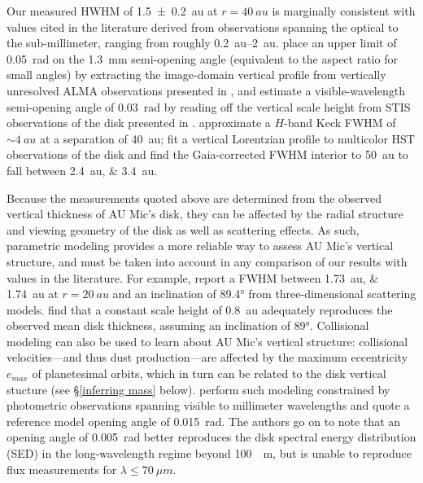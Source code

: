 \documentclass[modern]{aastex62}
\begin{document}
Our measured HWHM of \SI{1.5 \pm 0.2}{au} at $r=\SI{40}{au}$ is marginally consistent with values cited in the literature derived from observations spanning the optical to the sub-millimeter, ranging from roughly \SIrange{0.2}{2}{au}.
\citet{schuppler17} place an upper limit of \SI{0.05}{\radian} on the \SI{1.3}{mm} semi-opening angle (equivalent to the aspect ratio for small angles) by extracting the image-domain vertical profile from vertically unresolved ALMA observations presented in \citet{macgregor13}, and estimate a visible-wavelength semi-opening angle of \SI{0.03}{\radian} by reading off the vertical scale height from STIS observations of the disk presented in \citet{schneider14}.
\citet{metchev05} approximate a $H$-band Keck FWHM of $\sim \SI{4}{au}$ at a separation of \SI{40}{au};
\citet{krist05} fit a vertical Lorentzian profile to multicolor HST observations of the disk and find the Gaia-corrected FWHM interior to \SI{50}{au} to fall between \SIlist{2.4;3.4}{au}.

Because the measurements quoted above are determined from the observed vertical thickness of AU Mic's disk, they can be affected by the radial structure and viewing geometry of the disk as well as scattering effects. 
As such, parametric modeling provides a more reliable way to assess AU Mic's vertical structure, and must be taken into account in any comparison of our results with values in the literature.  
For example, \citet{krist05} report a FWHM between \SIlist{1.73;1.74}{au} at $r=\SI{20}{au}$ and an inclination of \ang[angle-symbol-over-decimal]{89.4} from three-dimensional scattering models.
\citet{metchev05} find that a constant scale height of \SI{0.8}{au} adequately reproduces the observed mean disk thickness, assuming an inclination of \ang[angle-symbol-over-decimal]{89}.
Collisional modeling can also be used to learn about AU Mic's vertical structure: collisional velocities---and thus dust production---are affected by the maximum eccentricity $e_{max}$ of planetesimal orbits, which in turn can be related to the disk vertical stucture (see \S \ref{inferring mass} below). 
\citet{schuppler17} perform such modeling constrained by photometric observations spanning visible to millimeter wavelengths and quote a reference model opening angle of \SI{0.015}{rad}.
The authors go on to note that an opening angle of \SI{0.005}{rad} better reproduces the disk spectral energy distribution (SED) in the long-wavelength regime beyond \SI{100}{\mu m}, but is unable to reproduce flux measurements for $\lambda \leq \SI{70}{\mu m}$.
\end{document}
